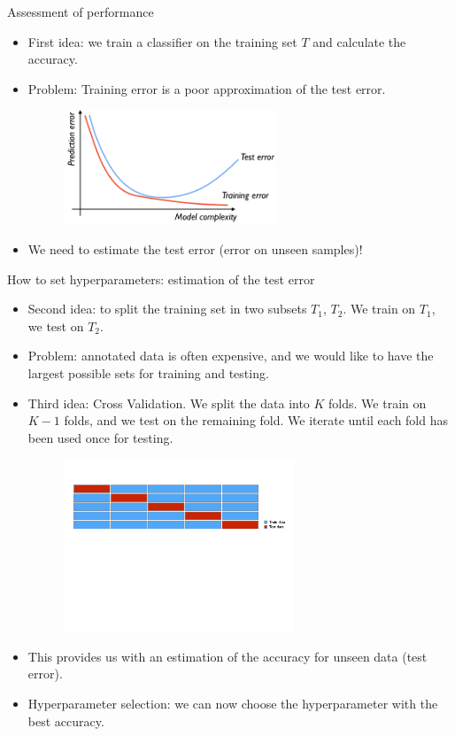 \documentclass[xcolor=pdftex,dvipsnames,table]{beamer}
\begin{document}
\begin{frame}{Assessment of performance}
	\begin{itemize}
		\item<1-> First idea: we train a classifier on the training set $T$ and calculate the accuracy. 
		\item<2-> Problem: Training error is a poor approximation of the test error. 
		\begin{figure}[htb]
			\includegraphics[width=0.6\textwidth]{../graphics/Training_and_test_error.png}
		\end{figure}
		\item<3-> We need to estimate the test error (error on unseen samples)!
	\end{itemize}
\end{frame}

\begin{frame}{How to set hyperparameters: estimation of the test error}
	\begin{itemize}
		\item<1-> Second idea: to split the training set in two subsets $T_1$, $T_2$. We train on $T_1$, we test on $T_2$. 
		\item<2-> Problem: annotated data is often expensive, and we would like to have the largest possible sets for training and testing.
		\item<3-> Third idea: Cross Validation. We split the data into $K$ folds. We train on $K-1$ folds, and we test on the remaining fold. We iterate until each fold has been used once for testing. 
		\begin{figure}[htb]
			\includegraphics[width=0.65\textwidth]{../graphics/CV1.pdf}
		\end{figure}
		\item<4-> This provides us with an estimation of the accuracy for unseen data (test error). 
		\item<5-> Hyperparameter selection: we can now choose the hyperparameter with the best accuracy.
	\end{itemize}
\end{frame}
\end{document}
